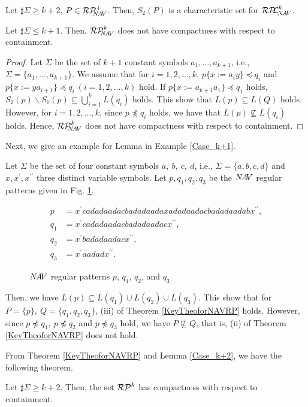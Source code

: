 \begin{col}
Let $\sharp\Sigma \ge k+2$, $P \in \mathcal{RP}^{+}_{\!\!\!N\!A\!V}$.
Then, $S_{2}(P)$ is a characteristic set for $\mathcal{RP\!\!L}^{k}_{\!N\!A\!V}$.%
\end{col}

\begin{lem}\label{Case_k+2}\label{k+2のとき}
Let $\sharp\Sigma \le k+1$.
Then, $\mathcal{RP}^{k}_{\!\!\!N\!A\!V}$ does not have compactness with respect to containment.
\end{lem}
\begin{proof}
Let $\Sigma$ be the set of $k+1$ constant symbols $a_{1}, \ldots , a_{k+1}$, i.e., $\Sigma = \{ a_{1}, \ldots , a_{k+1} \}$.
We assume that for $i=1,2,\ldots,k$, $p \{ x := a_{i}y \} \preceq q_{i}$ and $p \{ x := ya_{i+1} \} \preceq q_{i}~(i=1,2, \ldots ,k)$ hold.
If $p \{ x:= a_{k+1}a_{1} \} \preceq q_{1}$ holds, $S_{2}(p) \backslash S_{1}(p) \subseteq \bigcup^{k}_{i=1} L(q_{i})$ holds.
This show that $L(p) \subseteq L(Q)$ holds.
However, for $i=1,2,\ldots,k$, since $p \not \preceq q_{i}$ holds, we have that $L(p) \not \subseteq L(q_{i})$ holds.
Hence, $\mathcal{RP}^{k}_{\!\!\!N\!A\!V}$ does not have compactness with respect to containment.
\end{proof}

Next, we give an example for Lemma \label{Case_k+2} in Example \ref{Case_k+1}.
\begin{ex}\label{Case_k+1}\label{反例k+1}
Let $\Sigma$ be the set of four constant symbols $a,~b,~c,~d$, i.e., $\Sigma= \{a, b, c, d \}$ and $x,x^{\prime},x^{\prime\prime}$ three distinct variable symbols.
Let $p,q_{1},q_{2},q_{3}$ be the $N\!A\!V$ regular patterns given in Fig. \ref{Fig:CounterExampleforNAVR}. 
\begin{figure*}[tb]
\begin{align*}
p & = x^{\prime}cadadaadacbadadaadaxadadaadacbadadaadabx^{\prime\prime},\\
q_{1} & = x^{\prime}cadadaadacbadadaadacx^{\prime\prime},\\
q_{2} & = x^{\prime}badadaadacx^{\prime\prime},\\
q_{3} & = x^{\prime}aadadx^{\prime\prime}.
\end{align*}
\caption{$N\!A\!V$ regular patterns $p$, $q_{1}$, $q_{2}$, and $q_{3}$}\label{Fig:CounterExampleforNAVR}
\end{figure*}
\noindent
Then, we have  $L(p) \subseteq L(q_{1}) \cup L(q_{2}) \cup L(q_{3})$.
This show that for $P=\{p\},~Q=\{q_{1},q_{2},q_{3}\}$, (iii) of Theorem \ref{KeyTheoforNAVRP} holds.
However, since $p \not \preceq q_{1},~p \not \preceq q_{2}$ and $p \not \preceq q_{3}$ hold,
we have $P \not \sqsubseteq Q$, that is, (ii) of Theorem \ref{KeyTheoforNAVRP} does not hold.
\end{ex}

From Theorem \ref{KeyTheoforNAVRP} and Lemma \ref{Case_k+2}, we have the following theorem.

\begin{thm}\label{MainTheforNAVRP}
Let $\sharp\Sigma \ge k+2$.
Then, the set $\mathcal{RP}^{k}$ has compactness with respect to containment.
\end{thm}